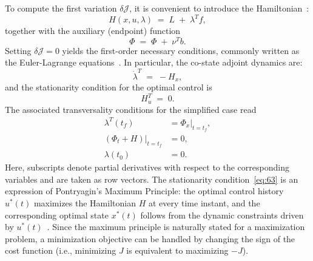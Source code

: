 To compute the first variation $\delta\mathcal{J}$, it is convenient to introduce the Hamiltonian~\cite{Optimization_Review}:
\begin{equation}
H(x,u,\lambda) \;=\; L \;+\; \lambda^{T} f ,
\tag{60}
\end{equation}
together with the auxiliary (endpoint) function
\begin{equation}
\Phi \;=\; \Phi \;+\; \nu^{T} b .
\tag{61}
\end{equation}
Setting $\delta\mathcal{J}=0$ yields the first-order necessary conditions, commonly written as the Euler-Lagrange equations~\cite{Optimization_Review}. In particular, the co-state adjoint dynamics are:
\begin{equation}
\dot{\lambda}^{T} \;=\; -H_{x},
\label{eq:62}
\end{equation}
and the stationarity condition for the optimal control is
\begin{equation}
H_{u}^{T} \;=\; 0 .
\label{eq:63}
\end{equation}
The associated transversality conditions for the simplified case read
\begin{equation}
\label{eq:transversality_conditions}
\begin{aligned}
\lambda^{T}(t_f) &= \left.\Phi_{x}\right|_{t=t_f}, \\
\left.(\Phi_{t}+H)\right|_{t=t_f} &= 0, \\
\lambda(t_0) &= 0.
\end{aligned}
\end{equation}
Here, subscripts denote partial derivatives with respect to the corresponding variables and are taken as row vectors. The stationarity condition~\ref{eq:63} is an expression of Pontryagin's Maximum Principle: the optimal control history $u^{*}(t)$ maximizes the Hamiltonian $H$ at every time instant, and the corresponding optimal state $x^{*}(t)$ follows from the dynamic constraints driven by $u^{*}(t)$~\cite{BettsSurvey1998}. Since the maximum principle is naturally stated for a maximization problem, a minimization objective can be handled by changing the sign of the cost function (i.e., minimizing $J$ is equivalent to maximizing $-J$).


